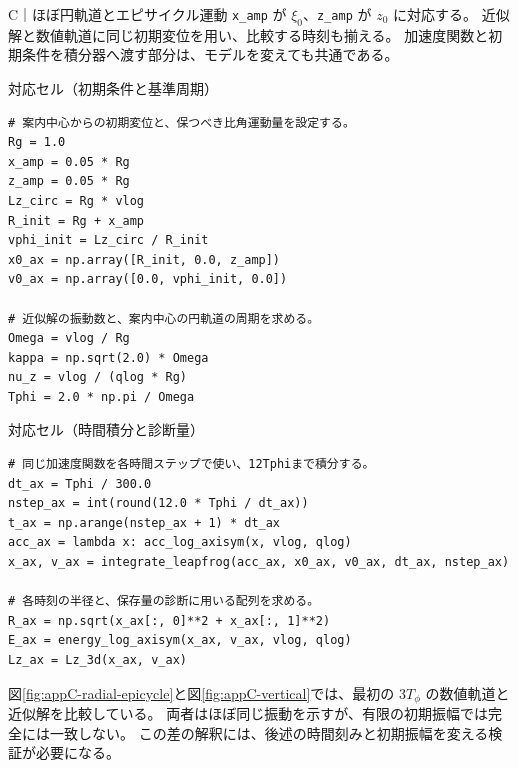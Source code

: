 \begin{notebookblock}{C｜ほぼ円軌道とエピサイクル運動}
\texttt{x\_amp} が $\xi_0$、\texttt{z\_amp} が $z_0$ に対応する。
近似解と数値軌道に同じ初期変位を用い、比較する時刻も揃える。
加速度関数と初期条件を積分器へ渡す部分は、モデルを変えても共通である。
\par\smallskip\noindent\begin{minipage}{\linewidth}
{\sffamily\small\color{graytext}対応セル（初期条件と基準周期）}
\begin{Verbatim}[fontsize=\footnotesize,xleftmargin=2mm,frame=single,framesep=1.8mm,framerule=0.35pt,rulecolor=\color{listingframe},fillcolor=\color{listingbg}]
# 案内中心からの初期変位と、保つべき比角運動量を設定する。
Rg = 1.0
x_amp = 0.05 * Rg
z_amp = 0.05 * Rg
Lz_circ = Rg * vlog
R_init = Rg + x_amp
vphi_init = Lz_circ / R_init
x0_ax = np.array([R_init, 0.0, z_amp])
v0_ax = np.array([0.0, vphi_init, 0.0])

# 近似解の振動数と、案内中心の円軌道の周期を求める。
Omega = vlog / Rg
kappa = np.sqrt(2.0) * Omega
nu_z = vlog / (qlog * Rg)
Tphi = 2.0 * np.pi / Omega
\end{Verbatim}
\end{minipage}

\par\smallskip\noindent\begin{minipage}{\linewidth}
{\sffamily\small\color{graytext}対応セル（時間積分と診断量）}
\begin{Verbatim}[fontsize=\footnotesize,xleftmargin=2mm,frame=single,framesep=1.8mm,framerule=0.35pt,rulecolor=\color{listingframe},fillcolor=\color{listingbg}]
# 同じ加速度関数を各時間ステップで使い、12Tphiまで積分する。
dt_ax = Tphi / 300.0
nstep_ax = int(round(12.0 * Tphi / dt_ax))
t_ax = np.arange(nstep_ax + 1) * dt_ax
acc_ax = lambda x: acc_log_axisym(x, vlog, qlog)
x_ax, v_ax = integrate_leapfrog(acc_ax, x0_ax, v0_ax, dt_ax, nstep_ax)

# 各時刻の半径と、保存量の診断に用いる配列を求める。
R_ax = np.sqrt(x_ax[:, 0]**2 + x_ax[:, 1]**2)
E_ax = energy_log_axisym(x_ax, v_ax, vlog, qlog)
Lz_ax = Lz_3d(x_ax, v_ax)
\end{Verbatim}
\end{minipage}

\end{notebookblock}

図\ref{fig:appC-radial-epicycle}と図\ref{fig:appC-vertical}では、最初の $3T_\phi$ の数値軌道と近似解を比較している。
両者はほぼ同じ振動を示すが、有限の初期振幅では完全には一致しない。
この差の解釈には、後述の時間刻みと初期振幅を変える検証が必要になる。

